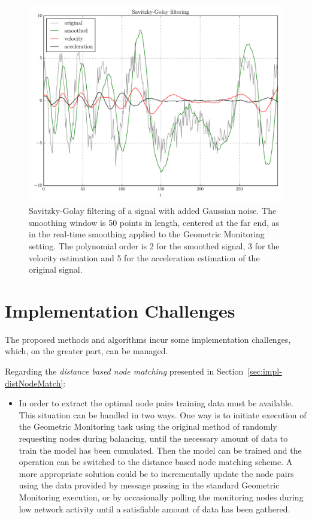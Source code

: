 \begin{figure}
\centering
\includegraphics[scale=0.60]{img/savgol.pdf}
\caption{Savitzky-Golay filtering of a signal with added Gaussian noise. The smoothing window is 50 points in length, centered at the far end, as in the real-time smoothing applied to the Geometric Monitoring setting. The polynomial order is 2 for the smoothed signal, 3 for the velocity estimation and 5 for the acceleration estimation of the original signal.} 
\label{fig:savgol}
\end{figure}

\section{Implementation Challenges} \label{sec:impl-implChallenges}

The proposed methods and algorithms incur some implementation challenges, which, on the greater part, can be managed.

Regarding the \emph{distance based node matching} presented in Section~\ref{sec:impl-distNodeMatch}: 
\begin{itemize}
\item In order to extract the optimal node pairs training data must be available. This situation can be handled in two ways. One way is to initiate execution of the Geometric Monitoring task using the original method of randomly requesting nodes during balancing, until the necessary amount of data to train the model has been cumulated. Then the model can be trained and the operation can be switched to the distance based node matching scheme. A more appropriate solution could be to incrementally update the node pairs using the data provided by message passing in the standard Geometric Monitoring execution, or by occasionally polling the monitoring nodes during low network activity until a satisfiable amount of data has been gathered.
\end{itemize}

